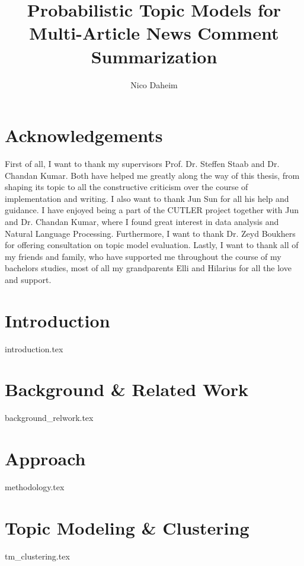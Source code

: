 \documentclass[m,bachelor,binding,palatino,twoside]{WeSTthesis}
\author{Nico Daheim}
\title{Probabilistic Topic Models for Multi-Article News Comment Summarization}
\theoremstyle{definition}
\begin{document}
\maketitle%

\section*{Acknowledgements}
First of all, I want to thank my supervisors Prof. Dr. Steffen Staab and Dr. Chandan Kumar. Both have helped me greatly along the way of this thesis, from shaping its topic to all the constructive criticism over the course of implementation and writing.
I also want to thank Jun Sun for all his help and guidance. I have enjoyed being a part of the CUTLER project together with Jun and Dr. Chandan Kumar, where I found great interest in data analysis and Natural Language Processing.
Furthermore, I want to thank Dr. Zeyd Boukhers for offering consultation on topic model evaluation.
Lastly, I want to thank all of my friends and family, who have supported me throughout the course of my bachelors studies, most of all my grandparents Elli and Hilarius for all the love and support.
\cleardoublepage


\tableofcontents%

\cleardoublepage%

\listoffigures
\listoftables
\listofalgorithms
\cleardoublepage


\section{Introduction}
{introduction.tex}
\newpage
\section{Background \& Related Work}
{background_relwork.tex}

\section{Approach}
{methodology.tex}

\section{Topic Modeling \& Clustering}
{tm_clustering.tex}
\end{document}
